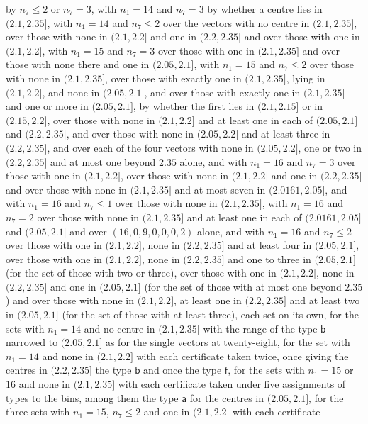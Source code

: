 \documentclass[11pt,reqno]{amsart}
\renewcommand{\_}{\origunderscore\allowbreak}
\numberwithin{equation}{section}
\theoremstyle{plain}
\theoremstyle{definition}
\theoremstyle{remark}
\begin{document}
by $n_7\le2$ or $n_7=3$, with $n_1=14$ and $n_7=3$ by whether a centre lies
in $(2.1,2.35]$, with $n_1=14$ and $n_7\le2$ over the vectors with no
centre in $(2.1,2.35]$, over those with none in $(2.1,2.2]$ and one in
$(2.2,2.35]$ and over those with one in $(2.1,2.2]$, with $n_1=15$ and
$n_7=3$ over those with one in $(2.1,2.35]$ and over those with none there
and one in $(2.05,2.1]$, with $n_1=15$ and $n_7\le2$ over those with none
in $(2.1,2.35]$, over those with exactly one in $(2.1,2.35]$, lying in
$(2.1,2.2]$, and none in $(2.05,2.1]$, and over those with exactly one in
$(2.1,2.35]$ and one or more in $(2.05,2.1]$, by whether the first lies in
$(2.1,2.15]$ or in $(2.15,2.2]$, over those with none in $(2.1,2.2]$ and
at least one in each of $(2.05,2.1]$ and $(2.2,2.35]$, and over those with none in $(2.05,2.2]$ and at least three in $(2.2,2.35]$, and over each of the
four vectors with none in $(2.05,2.2]$, one or two in $(2.2,2.35]$ and at
most one beyond $2.35$ alone, and with $n_1=16$ and $n_7=3$ over those with one
in $(2.1,2.2]$, over those with none in $(2.1,2.2]$ and one in $(2.2,2.35]$ and over
those with none in $(2.1,2.35]$ and at most seven in $(2.0161,2.05]$, and
with $n_1=16$ and $n_7\le1$ over those with none in $(2.1,2.35]$,
with $n_1=16$ and $n_7=2$ over those with none in $(2.1,2.35]$ and at least
one in each of $(2.0161,2.05]$ and $(2.05,2.1]$ and over
$(16,0,9,0,0,0,2)$ alone, and with $n_1=16$ and
$n_7\le2$ over those with one in $(2.1,2.2]$, none in $(2.2,2.35]$ and at
least four in $(2.05,2.1]$, over those with one in $(2.1,2.2]$, none in
$(2.2,2.35]$ and one to three in $(2.05,2.1]$ (for the set of those with
two or three), over those with one in $(2.1,2.2]$, none in $(2.2,2.35]$ and
one in $(2.05,2.1]$ (for the set of those with at most one beyond $2.35$) and over those with none in $(2.1,2.2]$, at
least one in $(2.2,2.35]$ and at least two in $(2.05,2.1]$ (for the set
of those with at least three), each
set on its own, for the
sets with $n_1=14$ and no centre in $(2.1,2.35]$ with the range of the type $\mathsf b$
narrowed to $(2.05,2.1]$ as for the single vectors at twenty-eight, for the
set with $n_1=14$ and none in $(2.1,2.2]$ with each certificate taken twice, once giving
the centres in $(2.2,2.35]$ the type $\mathsf b$ and once the type
$\mathsf f$, for the sets with $n_1=15$ or $16$ and none in $(2.1,2.35]$
with each certificate taken under five assignments of types to the bins,
among them the type $\mathsf a$ for the centres in $(2.05,2.1]$, for the three
sets with $n_1=15$, $n_7\le2$ and one in $(2.1,2.2]$ with each certificate
\end{document}
